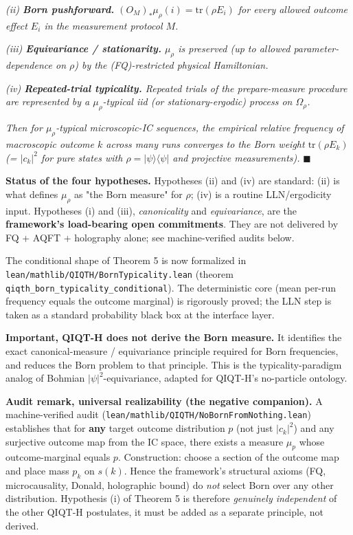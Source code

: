 \documentclass[11pt,a4paper]{article}
\begin{document}
\emph{(ii) \textbf{Born pushforward.} $(O_M)_* \mu_\rho(i) = \mathrm{tr}(\rho E_i)$ for every allowed outcome effect $E_i$ in the measurement protocol $M$.}

\emph{(iii) \textbf{Equivariance / stationarity.} $\mu_\rho$ is preserved (up to allowed parameter-dependence on $\rho$) by the (FQ)-restricted physical Hamiltonian.}

\emph{(iv) \textbf{Repeated-trial typicality.} Repeated trials of the prepare-measure procedure are represented by a $\mu_\rho$-typical iid (or stationary-ergodic) process on $\Omega_\rho$.}

\emph{Then for $\mu_\rho$-typical microscopic-IC sequences, the empirical relative frequency of macroscopic outcome $k$ across many runs converges to the Born weight $\mathrm{tr}(\rho E_k)$ (= $|c_k|^2$ for pure states with $\rho = |\psi\rangle\langle\psi|$ and projective measurements).} $\blacksquare$

\textbf{Status of the four hypotheses.} Hypotheses (ii) and (iv) are standard: (ii) is what defines $\mu_\rho$ as "the Born measure" for $\rho$; (iv) is a routine LLN/ergodicity input. Hypotheses (i) and (iii), \emph{canonicality} and \emph{equivariance}, are the \textbf{framework's load-bearing open commitments}. They are not delivered by FQ + AQFT + holography alone; see machine-verified audits below.

The conditional shape of Theorem 5 is now formalized in \texttt{lean/mathlib/QIQTH/BornTypicality.lean} (theorem \texttt{qiqth\_born\_typicality\_conditional}). The deterministic core (mean per-run frequency equals the outcome marginal) is rigorously proved; the LLN step is taken as a standard probability black box at the interface layer.

\textbf{Important, QIQT-H does not derive the Born measure.} It identifies the exact canonical-measure / equivariance principle required for Born frequencies, and reduces the Born problem to that principle. This is the typicality-paradigm analog of Bohmian $|\psi|^2$-equivariance, adapted for QIQT-H's no-particle ontology.

\textbf{Audit remark, universal realizability (the negative companion).} A machine-verified audit (\texttt{lean/mathlib/QIQTH/NoBornFromNothing.lean}) establishes that for \textbf{any} target outcome distribution $p$ (not just $|c_k|^2$) and any surjective outcome map from the IC space, there exists a measure $\mu_p$ whose outcome-marginal equals $p$. Construction: choose a section of the outcome map and place mass $p_k$ on $s(k)$. Hence the framework's structural axioms (FQ, microcausality, Donald, holographic bound) do \emph{not} select Born over any other distribution. Hypothesis (i) of Theorem 5 is therefore \emph{genuinely independent} of the other QIQT-H postulates, it must be added as a separate principle, not derived.
\end{document}
